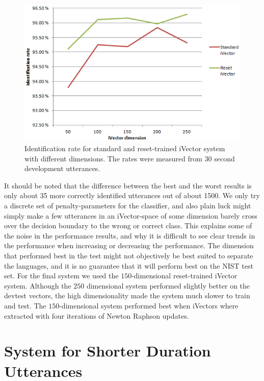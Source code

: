 \begin{figure}[hbt!]
	\begin{center}
	\includegraphics{figures/dimidentification.png}
	\caption{Identification rate for standard and reset-trained iVector system with different dimensions. The rates were measured from 30 second development utterances.}
	\label{fig:dimidrate}
	\end{center}
\end{figure}

It should be noted that the difference between the best and the worst results is only about 35 more correctly identified utterances out of about 1500. We only try a discrete set of penalty-parameters for the classifier, and also plain luck might simply make a few utterances in an iVector-space of some dimension barely cross over the decision boundary to the wrong or correct class. This explains some of the noise in the performance results, and why it is difficult to see clear trends in the performance when increasing or decreasing the performance. The dimension that performed best in the test might not objectively be best suited to separate the languages, and it is no guarantee that it will perform best on the NIST test set. For the final system we used the $150$-dimensional reset-trained iVector system. Although the $250$ dimensional system performed slightly better on the devtest vectors, the high dimensionality made the system much slower to train and test. The $150$-dimensional system performed best when iVectors where extracted with four iterations of Newton Raphson updates.

\section{System for Shorter Duration Utterances}

